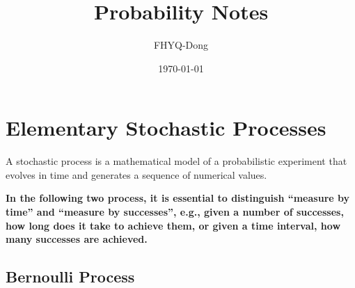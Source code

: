 \documentclass[device=normal, lang=en]{elegantbook}
\title{Probability Notes}
\author{FHYQ-Dong}
\date{\today}
\numberwithin{equation}{section}
\begin{document}
\maketitle
\frontmatter

\tableofcontents
\mainmatter
















\chapter{Elementary Stochastic Processes}
\begin{definition}
    A stochastic process is a mathematical model of a probabilistic experiment that evolves in time and generates a sequence of numerical values.
\end{definition}
\begin{remark}
    \textbf{In the following two process, it is essential to distinguish ``measure by time'' and ``measure by successes'', e.g., given a number of successes, how long does it take to achieve them, or given a time interval, how many successes are achieved.}
\end{remark}

\section{Bernoulli Process}
\end{document}
